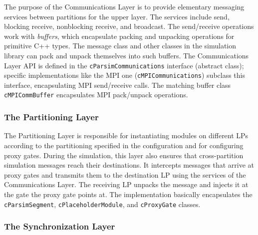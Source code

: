 The purpose of the Communications Layer is to
provide elementary messaging services between partitions for
the upper layer. The services include send, blocking receive,
nonblocking receive, and broadcast. The send/receive operations
work with \textit{buffers}, which encapsulate packing and unpacking
operations for primitive C++ types. The message class and
other classes in the simulation library can pack and unpack
themselves into such buffers. The Communications Layer API
is defined in the \texttt{cParsimCommunications} interface
(abstract class); specific implementations like the MPI
one (\texttt{cMPICommunications}) subclass this interface,
encapsulating MPI send/receive calls. The matching buffer
class \texttt{cMPICommBuffer} encapsulates MPI pack/unpack
operations.

\subsubsection{The Partitioning Layer}
\label{sec:parallel-exec:partitioning-layer}

The Partitioning Layer is responsible for instantiating
modules on different LPs according to the partitioning specified
in the configuration and for configuring proxy gates.
During the simulation, this layer also ensures that cross-partition
simulation messages reach their destinations. It intercepts messages
that arrive at proxy gates and transmits them to the destination LP
using the services of the Communications Layer. The receiving LP
unpacks the message and injects it at the gate the proxy gate points at.
The implementation basically encapsulates
the \texttt{cParsimSegment}, \texttt{cPlaceholderModule},
and \texttt{cProxyGate} classes.

\subsubsection{The Synchronization Layer}
\label{sec:parallel-exec:synchronization-layer}

